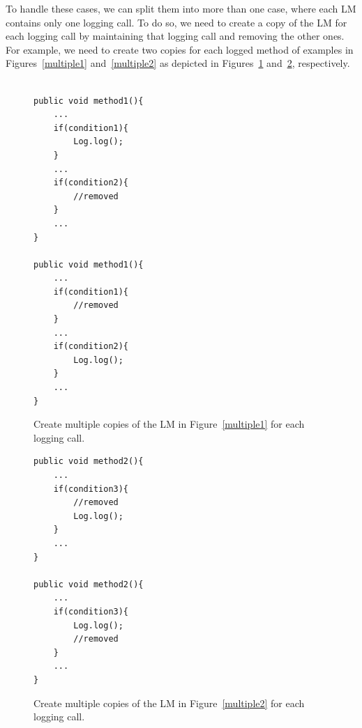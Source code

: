To handle these cases, we can split them into more than one case, where each LM contains only one logging call. To do so, we need to create a copy of the LM for each logging call by maintaining that logging call and removing the other ones. For example, we need to create two copies for each logged  method of examples in Figures~\ref{multiple1} and~\ref{multiple2} as depicted in Figures~\ref{multiple1-one} and~\ref{multiple2-one}, respectively.


\begin{figure}[H]
\def\baselinestretch{1}
\begin{lstlisting}

public void method1(){
	...
	if(condition1){
		Log.log();
	}
	...
	if(condition2){
		//removed
	}
	...
}

public void method1(){
	...
	if(condition1){
		//removed
	}
	...
	if(condition2){
		Log.log();
	}
	...
}

\end{lstlisting}
\caption{Create multiple copies of the LM in Figure~\ref{multiple1} for each logging call.\label{multiple1-one}}
\end{figure}



\begin{figure}[H]
\def\baselinestretch{1}
\begin{lstlisting}
public void method2(){
	...
	if(condition3){
		//removed
		Log.log();
	}
	...
}

public void method2(){
	...
	if(condition3){
		Log.log();
		//removed
	}
	...
}

\end{lstlisting}
\caption{Create multiple copies of the LM in Figure~\ref{multiple2} for each logging call.\label{multiple2-one}}
\end{figure}

